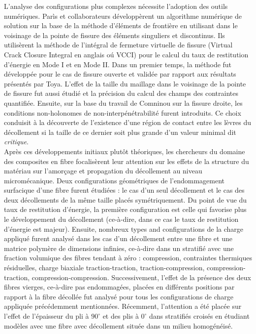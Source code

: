 L'analyse des configurations plus complexes n\'ecessite l'adoption des outils num\'eriques. Par\`is et collaborateurs d\'evelopp\`erent un algorithme num\'erique de solution sur la base de la m\'ethode d'\'el\'ements de fronti\`ere en utilisant dans le voisinage de la pointe de fissure des \'el\'ements singuliers et discontinus. Ils utilis\`erent la m\'ethode de l'int\'egral de fermeture virtuelle de fissure (Virtual Crack Closure Integral en anglais o\'u VCCI) pour le calcul du taux de restitution d'\'energie en Mode I et en Mode II. Dans un premier temps, la m\'ethode fut d\'evelopp\'ee pour le cas de fissure ouverte et valid\'ee par rapport aux r\'esultats pr\'esent\'es par Toya. L'effet de la taille du maillage dans le voisinage de la pointe de fissure fut aussi \'etudi\'e et la pr\'ecision du calcul des champs des contraintes quantifi\'ee. Ensuite, sur la base du travail de Comninou sur la fissure droite, les conditions non-holonomes de non-interp\'en\'etrabilit\'e furent introduits. Ce choix conduisit \`a la d\'ecouverte de l'existence d'une r\'egion de contact entre les l\`evres du d\'ecollement si la taille de ce dernier soit plus grande d'un valeur minimal dit \textit{critique}.\\

Apr\`es ces d\'eveloppements initiaux plutôt th\'eoriques, les chercheurs du domaine des composites en fibre focalis\`erent leur attention sur les effets de la structure du mat\'eriau sur l'amor\c{c}age et propagation du d\'ecollement au niveau microm\'ecanique. Deux configurations g\'eom\'etriques de l'endommagement surfacique d'une fibre furent \'etudi\'ees : le cas d'un seul d\'ecollement et le cas des deux d\'ecollements de la même taille plac\'es sym\'etriquement. Du point de vue du taux de restitution d'\'energie, la premi\`ere configuration est celle qui favorise plus le d\'eveloppement du d\'ecollement (ce-\`a-dire, dans ce cas le taux de restitution d'\'energie est majeur). Ensuite, nombreux types and configurations de la charge appliqu\'e furent analys\'e dans les cas d'un d\'ecollement entre une fibre et une matrice polym\`ere de dimensions infinies, ce-\`a-dire dans un stratifi\'e avec une fraction volumique des fibres tendant \`a z\'ero : compression, contraintes thermiques r\'esiduelles, charge biaxiale traction-traction, traction-compression, compression-traction, compression-compression. Successivement, l'effet de la pr\'esence des deux fibres vierges, ce-\`a-dire pas endommag\'ees, plac\'ees en diff\'erents positions par rapport \`a la fibre d\'ecoll\'ee fut analys\'e pour tous les configurations de charge appliqu\'ee pr\'ec\'edemment mentionn\'ees. R\'ecemment, l'attention a \'et\'e plac\'ee sur l'effet de l'\'epaisseur du pli \`a $90^{\circ}$ et des plis \`a $0^{\circ}$ dans stratifi\'es crois\'es en \'etudiant mod\`eles avec une fibre avec d\'ecollement situ\'ee dans un milieu homog\'en\'eis\'e.\\


